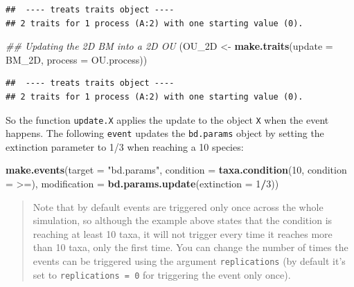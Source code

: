\documentclass[
]{book}
\newenvironment{Shaded}{\begin{snugshade}}{\end{snugshade}}
\newcommand{\CommentTok}[1]{\textcolor[rgb]{0.56,0.35,0.01}{\textit{#1}}}
\newcommand{\DataTypeTok}[1]{\textcolor[rgb]{0.13,0.29,0.53}{#1}}
\newcommand{\DecValTok}[1]{\textcolor[rgb]{0.00,0.00,0.81}{#1}}
\newcommand{\KeywordTok}[1]{\textcolor[rgb]{0.13,0.29,0.53}{\textbf{#1}}}
\newcommand{\NormalTok}[1]{#1}
\newcommand{\OperatorTok}[1]{\textcolor[rgb]{0.81,0.36,0.00}{\textbf{#1}}}
\newcommand{\StringTok}[1]{\textcolor[rgb]{0.31,0.60,0.02}{#1}}
\begin{document}
\begin{verbatim}
##  ---- treats traits object ---- 
## 2 traits for 1 process (A:2) with one starting value (0).
\end{verbatim}

\begin{Shaded}
\begin{Highlighting}[]
\CommentTok{\#\# Updating the 2D BM into a 2D OU}
\NormalTok{(OU\_2D \textless{}{-}}\StringTok{ }\KeywordTok{make.traits}\NormalTok{(}\DataTypeTok{update =}\NormalTok{ BM\_2D, }\DataTypeTok{process =}\NormalTok{ OU.process))}
\end{Highlighting}
\end{Shaded}

\begin{verbatim}
##  ---- treats traits object ---- 
## 2 traits for 1 process (A:2) with one starting value (0).
\end{verbatim}

So the function \texttt{update.X} applies the update to the object \texttt{X} when the event happens.
The following \texttt{event} updates the \texttt{bd.params} object by setting the extinction parameter to 1/3 when reaching a 10 species:

\begin{Shaded}
\begin{Highlighting}[]
\KeywordTok{make.events}\NormalTok{(}\DataTypeTok{target       =} \StringTok{"bd.params"}\NormalTok{,}
            \DataTypeTok{condition    =} \KeywordTok{taxa.condition}\NormalTok{(}\DecValTok{10}\NormalTok{, }\DataTypeTok{condition =} \StringTok{\textasciigrave{}}\DataTypeTok{\textgreater{}=}\StringTok{\textasciigrave{}}\NormalTok{),}
            \DataTypeTok{modification =} \KeywordTok{bd.params.update}\NormalTok{(}\DataTypeTok{extinction =} \DecValTok{1}\OperatorTok{/}\DecValTok{3}\NormalTok{))}
\end{Highlighting}
\end{Shaded}

\begin{quote}
Note that by default events are triggered only once across the whole simulation, so although the example above states that the condition is reaching at least 10 taxa, it will not trigger every time it reaches more than 10 taxa, only the first time. You can change the number of times the events can be triggered using the argument \texttt{replications} (by default it's set to \texttt{replications\ =\ 0} for triggering the event only once).
\end{quote}
\end{document}
